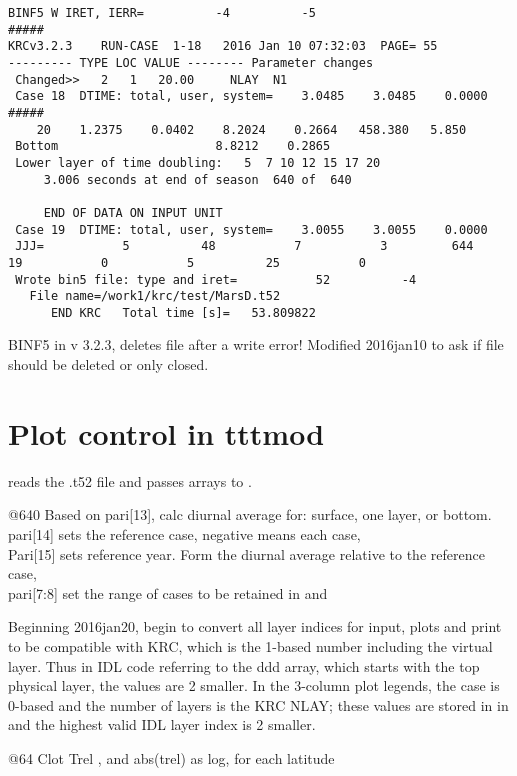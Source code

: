 \documentclass{article}
\begin{document}
\begin{verbatim}
BINF5 W IRET, IERR=          -4          -5
#####                            
KRCv3.2.3    RUN-CASE  1-18   2016 Jan 10 07:32:03  PAGE= 55
--------- TYPE LOC VALUE -------- Parameter changes
 Changed>>   2   1   20.00     NLAY  N1    
 Case 18  DTIME: total, user, system=    3.0485    3.0485    0.0000
#####
    20    1.2375    0.0402    8.2024    0.2664   458.380   5.850
 Bottom                      8.8212    0.2865
 Lower layer of time doubling:   5  7 10 12 15 17 20
     3.006 seconds at end of season  640 of  640

     END OF DATA ON INPUT UNIT
 Case 19  DTIME: total, user, system=    3.0055    3.0055    0.0000
 JJJ=           5          48           7           3         644          19           0           5          25           0
 Wrote bin5 file: type and iret=           52          -4
   File name=/work1/krc/test/MarsD.t52                                                       
      END KRC   Total time [s]=   53.809822 
\end{verbatim} 
BINF5 in v 3.2.3, deletes file after a write error!  Modified 2016jan10 to ask if file should be deleted or only closed.


\section{Plot control in tttmod}
 reads the .t52 file and passes arrays to .

@640 Based on pari[13], calc diurnal average  for: surface, one layer, or bottom.
\\ pari[14] sets the reference case, negative means each case, 
\\ Pari[15] sets reference year. Form the diurnal average relative to the reference case, 
\\ pari[7:8] set the range of cases to be retained  in   and 

Beginning 2016jan20, begin to convert all  layer indices for input,
plots and print to be compatible with KRC, which is the 1-based number including
the virtual layer. Thus in IDL code referring to the ddd array, which starts
with the top physical layer, the values are 2 smaller.  In the 3-column
 plot legends, the case is 0-based and the number of layers is the KRC
NLAY; these values are stored in  in  and the highest valid
IDL layer index is 2 smaller.

@64 Clot Trel , and abs(trel) as log, for each latitude 
\end{document}
